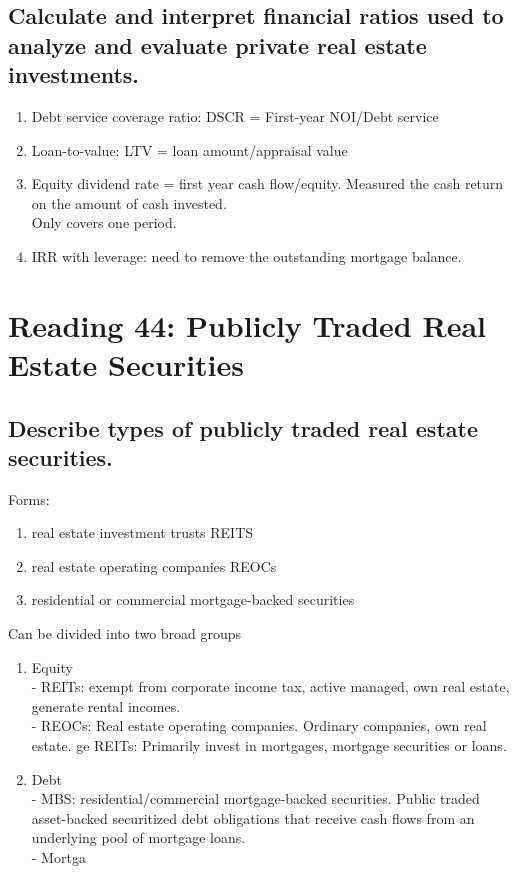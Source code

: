 \documentclass{article}
\newcommand{\be}{\begin{enumerate}}
\newcommand{\ee}{\end{enumerate}}
\begin{document}
\subsection{Calculate and interpret financial ratios used to analyze and evaluate
private real estate investments.}
\be
    \item Debt service coverage ratio: DSCR = First-year NOI/Debt service
    \item Loan-to-value: LTV = loan amount/appraisal value
    \item Equity dividend rate = first year cash flow/equity. Measured the cash return
    on the amount of cash invested.
    \\Only covers one period.
    \item IRR with leverage: need to remove the outstanding mortgage balance.
\ee



\section{Reading 44: Publicly Traded Real Estate Securities}
\subsection{Describe types of publicly traded real estate securities.}
Forms:
\be
    \item real estate investment trusts REITS
    \item real estate operating companies REOCs
    \item residential or commercial mortgage-backed securities
\ee
Can be divided into two broad groups
\be
    \item Equity
                \\ - REITs: exempt from corporate income tax, active managed, own real estate, generate rental incomes.
                \\ - REOCs: Real estate operating companies. Ordinary companies, own real estate.
            ge REITs: Primarily invest in mortgages, mortgage securities or loans.
    \item Debt
                \\ - MBS: residential/commercial mortgage-backed securities. Public traded asset-backed
                securitized debt obligations that receive cash flows from an underlying pool of
                mortgage loans.
                \\ - Mortga
\ee
\end{document}
